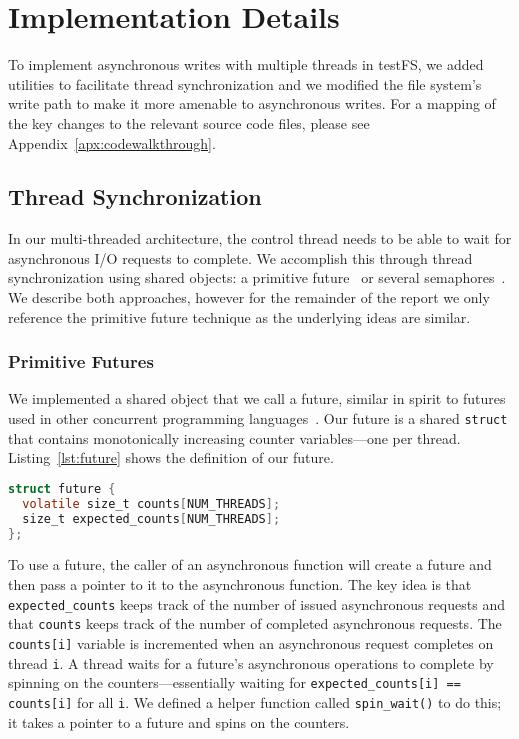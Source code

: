 \section{Implementation Details}
To implement asynchronous writes with multiple threads in testFS, we added
utilities to facilitate thread synchronization and we modified the file
system's write path to make it more amenable to asynchronous writes. For a
mapping of the key changes to the relevant source code files, please see
Appendix~\ref{apx:codewalkthrough}.

\subsection{Thread Synchronization}\label{sec:threadsync}
In our multi-threaded architecture, the control thread needs to be able to wait
for asynchronous I/O requests to complete. We accomplish this through thread
synchronization using shared objects: a primitive
future~\cite{futures-halstead85} or several
semaphores~\cite{semaphores-dijkstra65}. We describe both approaches, however
for the remainder of the report we only reference the primitive future
technique as the underlying ideas are similar.

\vspace{-0.2em}
\subsubsection{Primitive Futures}\label{sec:futures}
We implemented a shared object that we call a future, similar in spirit to
futures used in other concurrent programming
languages~\cite{futures-halstead85}. Our future is a shared {\tt struct} that
contains monotonically increasing counter variables---one per thread.
Listing~\ref{lst:future} shows the definition of our future.

\begin{lstlisting}[language=C,
  caption={The definition of our future.},
  captionpos=b,
  label={lst:future}]
struct future {
  volatile size_t counts[NUM_THREADS];
  size_t expected_counts[NUM_THREADS];
};
\end{lstlisting}

To use a future, the caller of an asynchronous function will create a future
and then pass a pointer to it to the asynchronous function. The key idea is
that {\tt expected\_counts} keeps track of the number of issued asynchronous
requests and that {\tt counts} keeps track of the number of completed
asynchronous requests. The {\tt counts[i]} variable is incremented when an
asynchronous request completes on thread {\tt i}. A thread waits for a future's
asynchronous operations to complete by spinning on the counters---essentially
waiting for {\tt expected\_counts[i] == counts[i]} for all {\tt i}. We defined
a helper function called {\tt spin\_wait()} to do this; it takes a pointer to a
future and spins on the counters.

